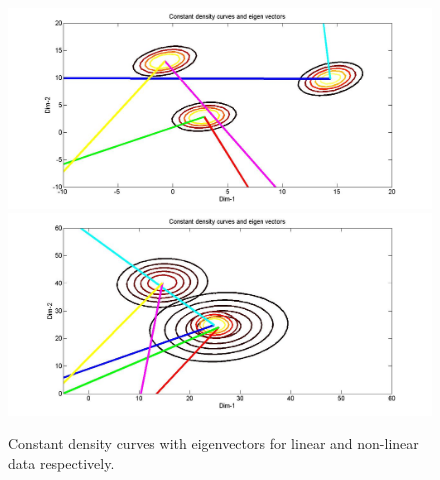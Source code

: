 \documentclass[10pt]{report}
\begin{document}
\begin{figure}[!htb]
  \includegraphics[width=\linewidth]{eigen_lin.jpg}
\endminipage\hfill
{}
  \includegraphics[width=\linewidth]{eigen_nonlin.jpg}
\endminipage\hfill
\caption{Constant density curves with eigenvectors for linear and non-linear data respectively.}
\end{figure}
\end{document}
